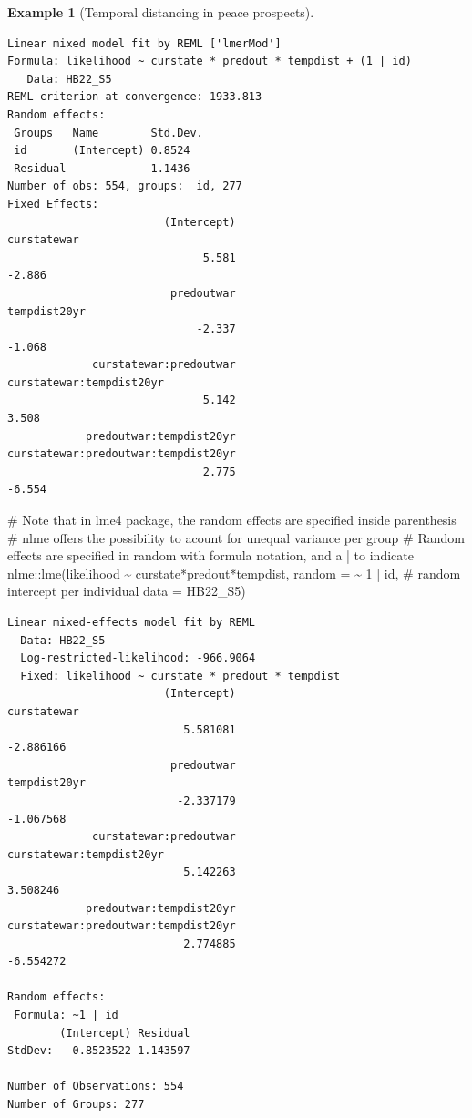 \documentclass[
  11pt,
  letterpaper,
]{scrbook}
\newenvironment{Shaded}{\begin{snugshade}}{\end{snugshade}}
\newcommand{\AttributeTok}[1]{\textcolor[rgb]{0.40,0.45,0.13}{#1}}
\newcommand{\CommentTok}[1]{\textcolor[rgb]{0.37,0.37,0.37}{#1}}
\newcommand{\DecValTok}[1]{\textcolor[rgb]{0.68,0.00,0.00}{#1}}
\newcommand{\FunctionTok}[1]{\textcolor[rgb]{0.28,0.35,0.67}{#1}}
\newcommand{\NormalTok}[1]{\textcolor[rgb]{0.00,0.23,0.31}{#1}}
\newcommand{\SpecialCharTok}[1]{\textcolor[rgb]{0.37,0.37,0.37}{#1}}
\theoremstyle{definition}
\newtheorem{example}{Example}[chapter]
\theoremstyle{definition}
\theoremstyle{remark}
\begin{document}
\begin{example}[Temporal distancing in peace
prospects]
\begin{verbatim}
Linear mixed model fit by REML ['lmerMod']
Formula: likelihood ~ curstate * predout * tempdist + (1 | id)
   Data: HB22_S5
REML criterion at convergence: 1933.813
Random effects:
 Groups   Name        Std.Dev.
 id       (Intercept) 0.8524  
 Residual             1.1436  
Number of obs: 554, groups:  id, 277
Fixed Effects:
                        (Intercept)                          curstatewar  
                              5.581                               -2.886  
                         predoutwar                         tempdist20yr  
                             -2.337                               -1.068  
             curstatewar:predoutwar             curstatewar:tempdist20yr  
                              5.142                                3.508  
            predoutwar:tempdist20yr  curstatewar:predoutwar:tempdist20yr  
                              2.775                               -6.554  
\end{verbatim}

\begin{Shaded}
\begin{Highlighting}[]
\CommentTok{\#  Note that in \textasciigrave{}lme4\textasciigrave{} package, the random effects are specified inside parenthesis}
\CommentTok{\# nlme offers the possibility to acount for unequal variance per group}
\CommentTok{\# Random effects are specified in \textasciigrave{}random\textasciigrave{} with formula notation, and a | to indicate}
\NormalTok{nlme}\SpecialCharTok{::}\FunctionTok{lme}\NormalTok{(likelihood }\SpecialCharTok{\textasciitilde{}}\NormalTok{ curstate}\SpecialCharTok{*}\NormalTok{predout}\SpecialCharTok{*}\NormalTok{tempdist, }
          \AttributeTok{random =} \SpecialCharTok{\textasciitilde{}} \DecValTok{1} \SpecialCharTok{|}\NormalTok{ id, }\CommentTok{\# random intercept per individual}
          \AttributeTok{data =}\NormalTok{ HB22\_S5)}
\end{Highlighting}
\end{Shaded}

\begin{verbatim}
Linear mixed-effects model fit by REML
  Data: HB22_S5 
  Log-restricted-likelihood: -966.9064
  Fixed: likelihood ~ curstate * predout * tempdist 
                        (Intercept)                         curstatewar 
                           5.581081                           -2.886166 
                         predoutwar                        tempdist20yr 
                          -2.337179                           -1.067568 
             curstatewar:predoutwar            curstatewar:tempdist20yr 
                           5.142263                            3.508246 
            predoutwar:tempdist20yr curstatewar:predoutwar:tempdist20yr 
                           2.774885                           -6.554272 

Random effects:
 Formula: ~1 | id
        (Intercept) Residual
StdDev:   0.8523522 1.143597

Number of Observations: 554
Number of Groups: 277 
\end{verbatim}

\end{example}
\end{document}
